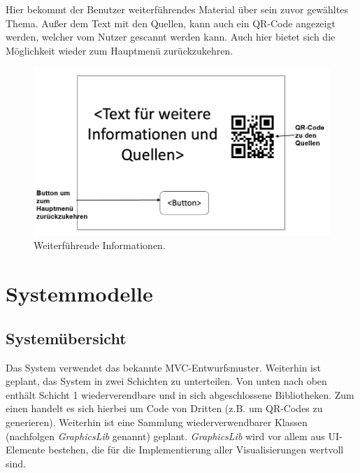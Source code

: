 \documentclass{article}
\begin{document}
Hier bekommt der Benutzer weiterführendes Material über sein zuvor gewähltes Thema. Außer dem Text mit den Quellen, kann auch ein QR-Code angezeigt werden, welcher vom Nutzer gescannt werden kann. Auch hier bietet sich die Möglichkeit wieder zum Hauptmenü zurückzukehren.

\begin{figure}[H]
  \centering
    \includegraphics[width=\textwidth]{resources/ui_walkthrough_other}
  \caption{Weiterführende Informationen.}
\end{figure}


\section{Systemmodelle}

\subsection{Systemübersicht}
Das System verwendet das bekannte MVC-Entwurfsmuster. Weiterhin ist geplant, das System in zwei Schichten zu unterteilen. Von unten nach oben enthält Schicht 1 wiederverendbare und in sich abgeschlossene Bibliotheken. Zum einen handelt es sich hierbei um Code von Dritten (z.B. um QR-Codes zu generieren). Weiterhin ist eine Sammlung wiederverwendbarer Klassen (nachfolgen {\it GraphicsLib} genannt) geplant. {\it GraphicsLib} wird vor allem aus UI-Elemente bestehen, die für die Implementierung aller Visualisierungen wertvoll sind.
\end{document}
